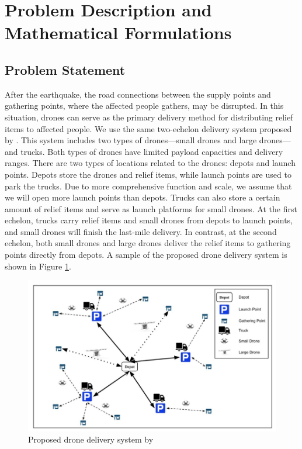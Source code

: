 \documentclass[preprint,review,11pt,authoryear]{elsarticle}
\begin{document}
\section{Problem Description and Mathematical Formulations}\label{sec:formulation}
\subsection{Problem Statement} \label{subsec:ProblemStatement}
After the earthquake, the road connections between the supply points and gathering points, where the affected people gathers, may be disrupted. In this situation, drones can serve as the primary delivery method for distributing relief items to affected people. We use the same two-echelon delivery system proposed by \cite{dukkanci2023drones}. This system includes two types of drones—small drones and large drones—and trucks. Both types of drones have limited payload capacities and delivery ranges. There are two types of locations related to the drones: depots and launch points. Depots store the drones and relief items, while launch points are used to park the trucks. Due to more comprehensive function and scale, we assume that we will open more launch points than depots. Trucks can also store a certain amount of relief items and serve as launch platforms for small drones. At the first echelon, trucks carry relief items and small drones from depots to launch points, and small drones will finish the last-mile delivery. In contrast, at the second echelon, both small drones and large drones deliver the relief items to gathering points directly from depots. A sample of the proposed drone delivery system is shown in Figure \ref{fig:drone_delivery_system}.

\begin{figure}[h!]
    \centering
    \includegraphics[width=0.7\linewidth]{Drone_delivery_system.png}
    \caption{Proposed drone delivery system by \cite{dukkanci2023drones}}
    \label{fig:drone_delivery_system}
\end{figure}
\end{document}
